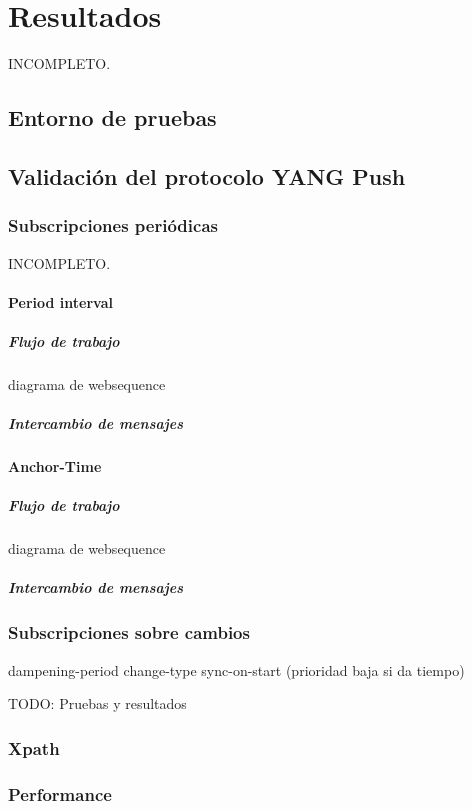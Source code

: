 \chapter{Resultados\label{sec:resultados}}
\Large{INCOMPLETO.}
\section{Entorno de pruebas}

\section{Validación del protocolo YANG Push}

\subsection{Subscripciones periódicas}
\Large{INCOMPLETO.}

\subsubsection{Period interval}

\paragraph{Flujo de trabajo}

diagrama de websequence

\paragraph{Intercambio de mensajes}


\subsubsection{Anchor-Time}

\paragraph{Flujo de trabajo}

diagrama de websequence

\paragraph{Intercambio de mensajes}



\subsection{Subscripciones sobre cambios}

dampening-period
change-type
sync-on-start (prioridad baja si da tiempo)

TODO: Pruebas y resultados

\subsection{Xpath}

\subsection{Performance}

